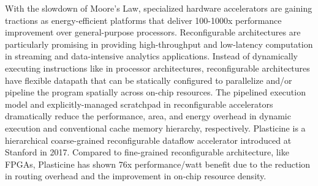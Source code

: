 


With the slowdown of Moore’s Law, specialized hardware accelerators are gaining tractions as energy-efficient platforms that deliver 100-1000x performance improvement over general-purpose processors. 
Reconfigurable architectures are particularly promising in providing high-throughput and low-latency computation in streaming and data-intensive analytics applications. Instead of dynamically executing instructions like in processor architectures, reconfigurable architectures have flexible datapath that can be statically configured to parallelize and/or pipeline the program spatially across on-chip resources. The pipelined execution model and explicitly-managed scratchpad in reconfigurable accelerators dramatically reduce the performance, area, and energy overhead in dynamic execution and conventional cache memory hierarchy, respectively. Plasticine is a hierarchical coarse-grained reconfigurable dataflow accelerator introduced at Stanford in 2017. Compared to fine-grained reconfigurable architecture, like FPGAs, Plasticine has shown 76x performance/watt benefit due to the reduction in routing overhead and the improvement in on-chip resource density. 

